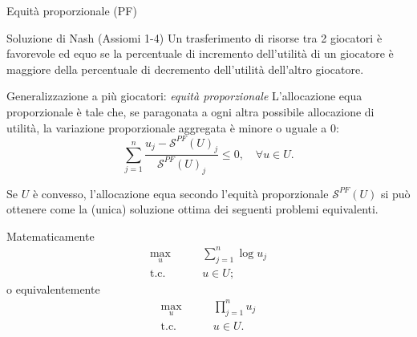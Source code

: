 \documentclass{beamer}
\begin{document}
	\begin{frame}{Equità proporzionale (PF)}
		\begin{block}{Soluzione di Nash (Assiomi 1-4)}
			Un trasferimento di risorse tra 2 giocatori è favorevole ed equo se la percentuale di incremento dell'utilità di un giocatore è maggiore della percentuale di decremento dell'utilità dell'altro giocatore.
		\end{block}
		\begin{block}{	Generalizzazione a più giocatori: \textit{equità proporzionale} }
			L'allocazione equa proporzionale è tale che, se paragonata a ogni altra possibile allocazione di utilità, la variazione proporzionale aggregata è minore o uguale a $0$:
			\vspace{-0.3cm}
			\begin{equation}
				\sum_{j=1}^n \frac{u_j - \mathcal{S}^{PF}(U)_j}{\mathcal{S}^{PF}(U)_j} \le 0, 	\quad \forall u \in U.
			\end{equation}
			\vspace{-0.5cm}
		\end{block}
	\end{frame}
	
	\begin{frame}
		Se $U$ è convesso, l'allocazione equa secondo l'equità proporzionale $\mathcal{S}^{PF}(U)$ si può ottenere come la (unica) soluzione ottima dei seguenti problemi equivalenti.
		\begin{block}{Matematicamente}
			\vspace{-0.6cm}
			\begin{equation}
				\begin{split}
					\underset{u}{\text{max}} & \qquad \sum_{j=1}^n \log{u_j} \\
					\text{t.c.} & \qquad u \in U;
				\end{split}
			\end{equation}
			o equivalentemente
			\vspace{-0.3cm}
			\begin{equation}
				\begin{split}
					\underset{u}{\text{max}} & \qquad \prod_{j=1}^n u_j \\
					\text{t.c.} & \qquad u \in U.
				\end{split}
			\end{equation}
			\vspace{-0.3cm}
		\end{block}
	\end{frame}
	
\end{document}
